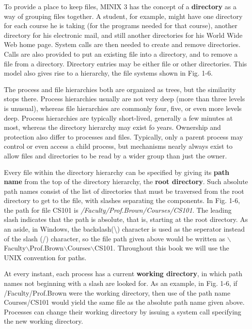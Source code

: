 \documentclass{book}
\newcommand {\kw}  [1] {\textbf{#1}}
\newcommand {\sys} [1] {\textsl{#1}}
\begin{document}
To provide a place to keep files, MINIX 3 has the concept of a \kw{directory} as a way of grouping files together.
A student, for example, might have one directory for each course he is taking (for the programs needed for that course),
another directory for his electronic mail, and still another directories for his World Wide Web home page.
System calls are then needed to create and remove directories.
Calls are also provided to put an existing file into a directory, and to remove a file from a directory.
Directory entries may be either file or other directories.
This model also gives rise to a hierarchy, the file systems shown in Fig. 1-6.

The process and file hierarchies both are organized as trees, but the similarity stops there.
Process hierarchies usually are not very deep (more than three levels is unusual), 
whereas file hierarchies are commonly four, five, or even more levels deep.
Process hierarchies are typically short-lived, generally a few minutes at most, 
whereas the directory hierarchy may exist fo years.
Ownership and protection also differ to processes and files.
Typically, only a parent process may control or even access a child process, 
but mechanisms nearly always exist to allow files and directories to be read by a wider group than just the owner.

Every file within the directory hierarchy can be specified by giving its \kw{path name} from the top of the directory hierarchy, the \kw{root directory}.
Such absolute path names consist of the list of directories that must be traversed from the root directory to get to the file, 
with slashes separating the components.
In Fig. 1-6, the path for file CS101 is \sys{/Faculty/Prof.Brown/Courses/CS101}.
The leading slash indicates that the path is absolute, that is, starting at the root directory.
As an aside, in Windows, the backslash(\textbackslash) character is used as the seperator instead of the slash (/) character, 
so the file path given above would be written as $\backslash$Faculty$\backslash$Prof.Brown$\backslash$Courses$\backslash$CS101.
Throughout this book we will use the UNIX convention for paths.

At every instant, each process has a current \kw{working directory}, in which path names not beginning with a slash are looked for.
As an example, in Fig. 1-6, if /Faculty/Prof.Brown were the working directory, 
then use of the path name Courses/CS101 would yield the same file as the absolute path name given above. 
Processes can change their working directory by issuing a system call specifying the new working directory.
\end{document}
